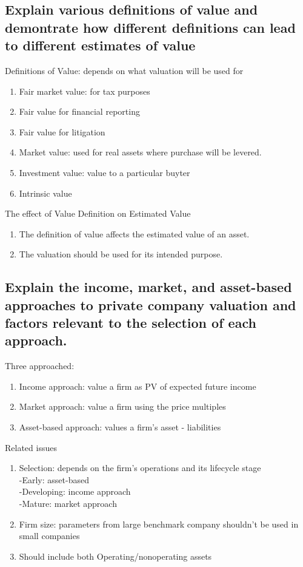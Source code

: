 \documentclass{article}
\newcommand{\be}{\begin{enumerate}}
\newcommand{\ee}{\end{enumerate}}
\begin{document}
\subsection{Explain various definitions of value and demontrate how different definitions
can lead to different estimates of value}
Definitions of Value: depends on what valuation will be used for
\be
    \item Fair market value: for tax purposes
    \item Fair value for financial reporting
    \item Fair value for litigation
    \item Market value: used for real assets where purchase will be levered.
    \item Investment value: value to a particular buyter
    \item Intrinsic value
\ee
The effect of Value Definition on Estimated Value
\be
    \item The definition of value affects the estimated value of an asset.
    \item The valuation should be used for its intended purpose.
\ee
\subsection{Explain the income, market, and asset-based approaches to private company
valuation and factors relevant to the selection of each approach.}
Three approached:
\be
    \item Income approach: value a firm as PV of expected future income
    \item Market approach: value a firm using the price multiples
    \item Asset-based approach: values a firm's asset - liabilities
\ee
Related issues
\be
    \item Selection: depends on the firm's operations and its lifecycle stage
        \\-Early: asset-based
        \\-Developing: income approach
        \\-Mature: market approach
    \item Firm size: parameters from large benchmark company shouldn't be used in small companies
    \item Should include both Operating/nonoperating assets
\ee
\end{document}
